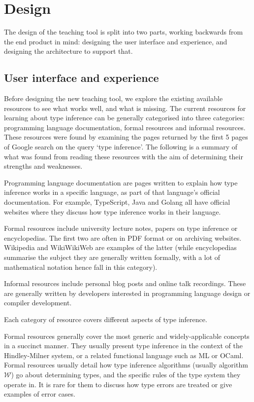 \documentclass[a4paper,fleqn,oneside,12pt]{report}
\newcommand{\W}{$\mathcal{W}$}
\begin{document}
\chapter{Design}\label{id:h.7ggvdxb04tzm}

The design of the teaching tool is split into two parts, working backwards from the end product in mind: designing the user interface and experience, and designing the architecture to support that.

\section{User interface and experience}\label{id:h.dr046u473e01}

Before designing the new teaching tool, we explore the existing available resources to see what works well, and what is missing. The current resources for learning about type inference can be generally categorised into three categories: programming language documentation, formal resources and informal resources. These resources were found by examining the pages returned by the first 5 pages of Google search on the query `type inference'. The following is a summary of what was found from reading these resources with the aim of determining their strengths and weaknesses.

Programming language documentation are pages written to explain how type inference works in a specific language, as part of that language’s official documentation. For example, TypeScript, Java and Golang all have official websites where they discuss how type inference works in their language.

Formal resources include university lecture notes, papers on type inference or encyclopedias. The first two are often in PDF format or on archiving websites. Wikipedia and WikiWikiWeb are examples of the latter (while encyclopedias summarise the subject they are generally written formally, with a lot of mathematical notation hence fall in this category).

Informal resources include personal blog posts and online talk recordings. These are generally written by developers interested in programming language design or compiler development.

Each category of resource covers different aspects of type inference.

Formal resources generally cover the most generic and widely-applicable concepts in a succinct manner. They usually present type inference in the context of the Hindley-Milner system, or a related functional language such as ML or OCaml. Formal resources usually detail how type inference algorithms (usually algorithm \W) go about determining types, and the specific rules of the type system they operate in. It is rare for them to discuss how type errors are treated or give examples of error cases.
\end{document}
